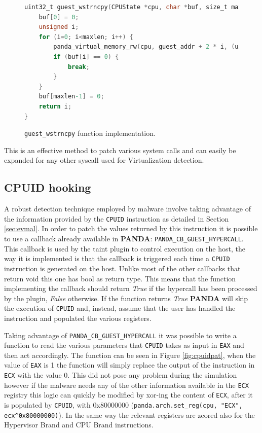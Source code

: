 \begin{figure}[htp]
\centering
\begin{lstlisting}[language=C] 
uint32_t guest_wstrncpy(CPUState *cpu, char *buf, size_t maxlen, target_ulong guest_addr) {
    buf[0] = 0;
    unsigned i;
    for (i=0; i<maxlen; i++) {
        panda_virtual_memory_rw(cpu, guest_addr + 2 * i, (uint8_t *)&buf[i], 1, 0);
        if (buf[i] == 0) {
            break;
        }
    }
    buf[maxlen-1] = 0;
    return i;
}
\end{lstlisting}
\caption{\lstinline{guest_wstrncpy} function implementation.}
\label{fig:gstrin}
\end{figure}

This is an effective method to patch various system calls and can easily be expanded for any other syscall used for Virtualization detection.


\subsection{CPUID hooking}

A robust detection technique employed by malware involve taking advantage of the information provided by the \lstinline{CPUID} instruction as detailed in Section \ref{sec:evmal}. In order to patch the values returned by this instruction it is possible to use a callback already available in \textbf{PANDA}: \lstinline{PANDA_CB_GUEST_HYPERCALL}. This callback is used by the taint plugin to control execution on the host, the way it is implemented is that the callback is triggered each time a \lstinline{CPUID} instruction is generated on the host. Unlike most of the other callbacks that return void this one has bool as return type. This means that the function implementing the callback should return \textit{True} if the hypercall has been processed by the plugin, \textit{False} otherwise. If the function returns \textit{True} \textbf{PANDA} will skip the execution of \lstinline{CPUID} and, instead, assume that the user has handled the instruction and populated the various registers. 

Taking advantage of \lstinline{PANDA_CB_GUEST_HYPERCALL} it was possible to write a function to read the various parameters that \lstinline{CPUID} takes as input in \lstinline{EAX} and then act accordingly. The function can be seen in Figure \ref{fig:cpuidpat}, when the value of \lstinline{EAX} is 1 the function will simply replace the output of the instruction in \lstinline{ECX} with the value 0. This did not pose any problem during the simulation however if the malware needs any of the other information available in the \lstinline{ECX} registry this logic can quickly be modified by xor-ing the content of \lstinline{ECX}, after it is populated by \lstinline{CPUID}, with 0x80000000 (\lstinline{panda.arch.set_reg(cpu, "ECX", ecx^0x80000000)}). In the same way the relevant registers are zeored also for the Hypervisor Brand and CPU Brand instructions.

